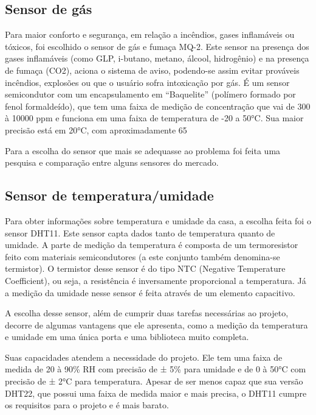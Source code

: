 \subsection{Sensor de gás}
\par Para maior conforto e segurança, em relação a incêndios, gases inflamáveis ou tóxicos, foi escolhido o sensor de gás e fumaça MQ-2. Este sensor na presença dos gases inflamáveis (como GLP, i-butano, metano, álcool, hidrogênio) e na presença de fumaça (CO2), aciona o sistema de aviso, podendo-se assim evitar prováveis incêndios, explosões ou que o usuário sofra intoxicação por gás.  É um sensor semicondutor com um encapsulamento em “Baquelite” (polímero formado por fenol formaldeído), que tem uma faixa de medição de concentração que vai de 300 à 10000 ppm e funciona em uma faixa de temperatura de -20 a 50°C. Sua maior precisão está em 20°C, com aproximadamente 65%
\par Para a escolha do sensor que mais se adequasse ao problema foi feita uma pesquisa e comparação entre alguns sensores do mercado.


\subsection{Sensor de temperatura/umidade}
\par Para obter informações sobre temperatura e umidade da casa, a escolha feita foi o sensor DHT11. Este sensor capta dados tanto de temperatura quanto de umidade. A parte de medição da temperatura é composta de um termoresistor feito com materiais semicondutores (a este conjunto também denomina-se termistor). O termistor desse sensor é do tipo NTC (Negative Temperature Coefficient), ou seja, a resistência é inversamente proporcional a temperatura. Já a medição da umidade nesse sensor é feita através de um elemento capacitivo.
\par A escolha desse sensor, além de cumprir duas tarefas necessárias ao projeto, decorre de algumas vantagens que ele apresenta, como a medição da temperatura e umidade em uma única porta e uma biblioteca muito completa.
\par Suas capacidades atendem a necessidade do projeto. Ele tem uma faixa de medida de 20 à 90\% RH com precisão de ± 5\% para umidade e de 0 à 50°C com precisão de ± 2°C para temperatura. Apesar de ser menos capaz que sua versão DHT22, que possui uma faixa de medida maior e mais precisa, o DHT11 cumpre os requisitos para o projeto e é mais barato.

